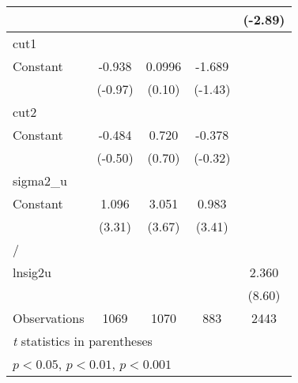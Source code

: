 {\begin{longtable}{l*{4}{c}}
                &                  &                  &                  &  (-2.89)         \\
\hline
cut1            &                  &                  &                  &                  \\
Constant        &   -0.938         &   0.0996         &   -1.689         &                  \\
                &  (-0.97)         &   (0.10)         &  (-1.43)         &                  \\
\hline
cut2            &                  &                  &                  &                  \\
Constant        &   -0.484         &    0.720         &   -0.378         &                  \\
                &  (-0.50)         &   (0.70)         &  (-0.32)         &                  \\
\hline
sigma2\_u        &                  &                  &                  &                  \\
Constant        &    1.096\sym{***}&    3.051\sym{***}&    0.983\sym{***}&                  \\
                &   (3.31)         &   (3.67)         &   (3.41)         &                  \\
\hline
/               &                  &                  &                  &                  \\
lnsig2u         &                  &                  &                  &    2.360\sym{***}\\
                &                  &                  &                  &   (8.60)         \\
\hline
Observations    &     1069         &     1070         &      883         &     2443         \\
\hline\hline
\multicolumn{5}{l}{\footnotesize \textit{t} statistics in parentheses}\\
\multicolumn{5}{l}{\footnotesize \sym{*} \(p<0.05\), \sym{**} \(p<0.01\), \sym{***} \(p<0.001\)}\\
\end{longtable}
}
